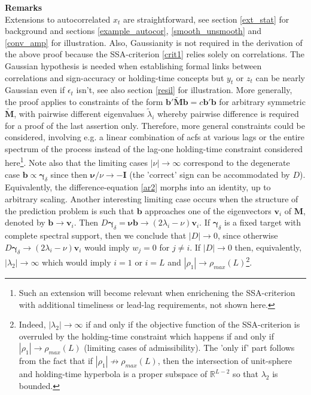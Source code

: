 \documentclass[a4paper]{article}
\begin{document}
\textbf{Remarks}\\
Extensions to autocorrelated $x_t$ are straightforward, see section \ref{ext_stat} for background and sections \ref{example_autocor}, \ref{smooth_unsmooth} and \ref{conv_amp} for illustration. Also, Gaussianity is not required in the derivation of the above proof because the SSA-criterion \ref{crit1} relies solely on correlations. The Gaussian hypothesis is needed when  establishing formal links between correlations and sign-accuracy or holding-time concepts but  $y_t$ or $z_t$ can be nearly Gaussian even if $\epsilon_t$ isn't, see also section \ref{resil} for illustration. More generally, the proof applies to constraints of the form $\mathbf{b}'\tilde{\mathbf{M}}\mathbf{b}=c\mathbf{b}'\mathbf{b}$ for arbitrary symmetric $\tilde{\mathbf{M}}$, with pairwise different eigenvalues $\tilde{\lambda}_i$ whereby pairwise difference is required for a proof of the last assertion only. Therefore, more general constraints could be considered, involving e.g. a linear combination of acfs at various lags or the entire spectrum of the process instead of the lag-one holding-time constraint considered here\footnote{Such an extension will become relevant when enrichening the SSA-criterion with additional timeliness or lead-lag requirements, not shown here.}. Note also that the limiting cases $|\nu|\to\infty$ correspond to the degenerate case $\mathbf{b}\propto\boldsymbol{\gamma}_{\delta}$ since then $\boldsymbol{\nu}/\nu\to-\mathbf{I}$ (the 'correct' sign can be accommodated by $D$). Equivalently, the difference-equation \ref{ar2} morphs into an identity, up to arbitrary scaling. Another interesting limiting case occurs when the structure of the prediction problem is such that $\mathbf{b}$ approaches one of the eigenvectors $\mathbf{v}_i$ of $\mathbf{M}$, denoted by $\mathbf{b}\to\mathbf{v}_i$. Then $D\boldsymbol{\gamma}_{\delta}=\boldsymbol{\nu}\mathbf{b}\to(2\lambda_i-\nu)\mathbf{v}_i$. If $\boldsymbol{\gamma}_{\delta}$ is a fixed target with complete spectral support, then we conclude that $|D|\to 0$, since otherwise $D\boldsymbol{\gamma}_{\delta}\to(2\lambda_i-\nu)\mathbf{v}_i$ would imply $w_j=0$ for $j\neq i$. If $|D|\to 0$ then, equivalently,  $|\lambda_2|\to\infty$ which would imply $i=1$ or $i=L$ and $|\rho_1|\to\rho_{max}(L)$\footnote{Indeed, $|\lambda_2|\to\infty$ if and only if the objective function of the SSA-criterion is overruled by the holding-time constraint which happens if and only if $|\rho_1|\to\rho_{max}(L)$ (limiting cases of admissibility). The 'only if' part follows from the fact that if $|\rho_1|\not\to\rho_{max}(L)$, then the intersection of unit-sphere and holding-time hyperbola is a proper subspace of $\mathbb{R}^{L-2}$ so that $\lambda_2$ is bounded.}. %
\end{document}
